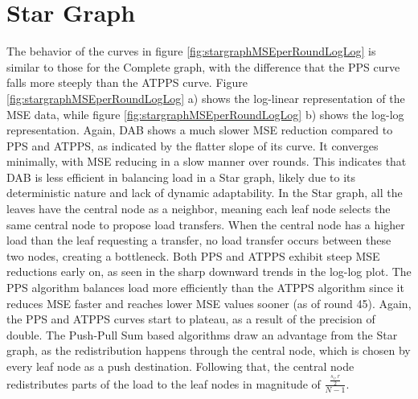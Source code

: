 \section{Star Graph}\label{sec:stargraph}
The behavior of the curves in figure \ref{fig:stargraphMSEperRoundLogLog} is similar to those for the Complete graph, with the difference that the PPS curve falls more steeply than the ATPPS curve. Figure \ref{fig:stargraphMSEperRoundLogLog} a) shows the log-linear representation of the MSE data, while figure \ref{fig:stargraphMSEperRoundLogLog} b) shows the log-log representation. Again, DAB shows a much slower MSE reduction compared to PPS and ATPPS, as indicated by the flatter slope of its curve. It converges minimally, with MSE reducing in a slow manner over rounds. This indicates that DAB is less efficient in balancing load in a Star graph, likely due to its deterministic nature and lack of dynamic adaptability. In the Star graph, all the leaves have the central node as a neighbor, meaning each leaf node selects the same central node to propose load transfers. When the central node has a higher load than the leaf requesting a transfer, no load transfer occurs between these two nodes, creating a bottleneck. Both PPS and ATPPS exhibit steep MSE reductions early on, as seen in the sharp downward trends in the log-log plot. The PPS algorithm balances load more efficiently than the ATPPS algorithm since it reduces MSE faster and reaches lower MSE values sooner (as of round 45). Again, the PPS and ATPPS curves start to plateau, as a result of the precision of double. The Push-Pull Sum based algorithms draw an advantage from the Star graph, as the redistribution happens through the central node, which is chosen by every leaf node as a push destination. Following that, the central node redistributes parts of the load to the leaf nodes in magnitude of $\frac{\frac{s_i,r}{2}}{N-1}$.

